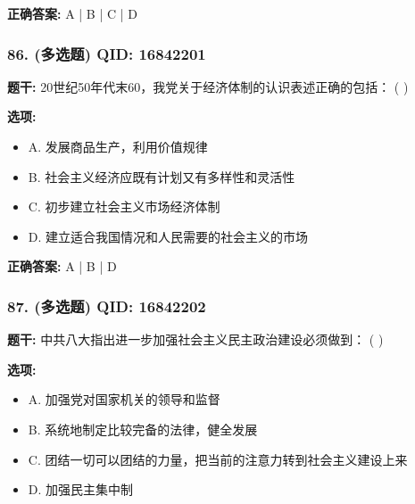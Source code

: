 \documentclass[12pt,UTF8]{ctexart}
\begin{document}
\textbf{正确答案:}
A | B | C | D

\vspace{0.3em}\hrulefill\vspace{0.7em}

\subsubsection*{86. (多选题) \small QID: 16842201}

\textbf{题干:}
20世纪50年代末60，我党关于经济体制的认识表述正确的包括： ( )

\textbf{选项:}
\begin{itemize}[leftmargin=*]

  \item A. 发展商品生产，利用价值规律

  \item B. 社会主义经济应既有计划又有多样性和灵活性

  \item C. 初步建立社会主义市场经济体制

  \item D. 建立适合我国情况和人民需要的社会主义的市场

\end{itemize}

\textbf{正确答案:}
A | B | D

\vspace{0.3em}\hrulefill\vspace{0.7em}

\subsubsection*{87. (多选题) \small QID: 16842202}

\textbf{题干:}
中共八大指出进一步加强社会主义民主政治建设必须做到： ( )

\textbf{选项:}
\begin{itemize}[leftmargin=*]

  \item A. 加强党对国家机关的领导和监督

  \item B. 系统地制定比较完备的法律，健全发展

  \item C. 团结一切可以团结的力量，把当前的注意力转到社会主义建设上来

  \item D. 加强民主集中制

\end{itemize}
\end{document}
